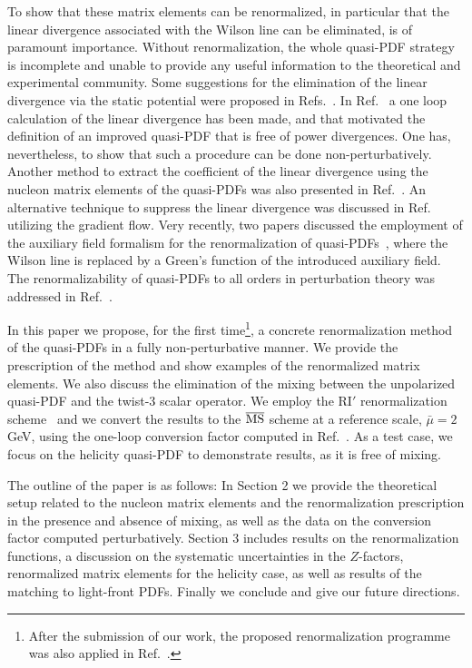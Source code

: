\medskip
To show that these matrix elements can be renormalized, in particular that the linear divergence associated with
the Wilson line can be eliminated, is of paramount importance. Without renormalization, the whole quasi-PDF strategy
is incomplete and unable to provide any useful information to the theoretical and experimental community. Some suggestions
for the elimination of the linear divergence via the static potential were proposed in Refs.~\cite{Ma:2014jla,Ishikawa:2016znu}.
In Ref.~\cite{Chen:2016fxx} a one loop calculation of the linear divergence has been made, and that motivated the definition of an
improved quasi-PDF that is free of power divergences. One has, nevertheless, to show that such a procedure can be done non-perturbatively.
Another method to extract the coefficient of the linear divergence using the nucleon matrix elements of the quasi-PDFs was also presented
in Ref.~\cite{Constantinou:2017sej}. An alternative technique to suppress the linear divergence was discussed in Ref.~\cite{Monahan:2016bvm}
utilizing the gradient flow. Very recently, two papers discussed the employment of the auxiliary field formalism for the renormalization of
quasi-PDFs~\cite{Ji:2017oey,Green:2017xeu}, where the Wilson line is replaced by a Green's function of the introduced auxiliary field.
The renormalizability of quasi-PDFs to all orders in perturbation theory was addressed in Ref.~\cite{Ishikawa:2017faj}.

\medskip
In this paper we propose, for the first time\footnote{After the submission of our work, the proposed renormalization programme was also applied in Ref.~\cite{Chen:2017mzz}.}, a concrete renormalization method of the quasi-PDFs in a fully non-perturbative manner.
We provide the prescription of the method and show examples of the renormalized matrix elements. We also discuss the
elimination of the mixing between the unpolarized quasi-PDF and the twist-3 scalar operator.
We employ the RI$'$ renormalization scheme~\cite{Martinelli:1994ty} and we convert the results to the
${\overline{\rm MS}}$ scheme at a reference scale, $\bar\mu{=}2$ GeV, using the one-loop conversion factor computed in Ref.~\cite{Constantinou:2017sej}.
As a test case, we focus on the helicity quasi-PDF to demonstrate results, as it is free of mixing.

\medskip
The outline of the paper is as follows: In Section 2 we provide the theoretical setup related to the nucleon
matrix elements and the renormalization prescription in the presence and absence of mixing,
as well as the data on the conversion factor computed perturbatively.
Section 3 includes results on the
renormalization functions, a discussion on the systematic uncertainties in the $Z$-factors, renormalized matrix elements for the helicity case, as well as results of the matching to light-front PDFs. Finally we conclude and give our future directions.
